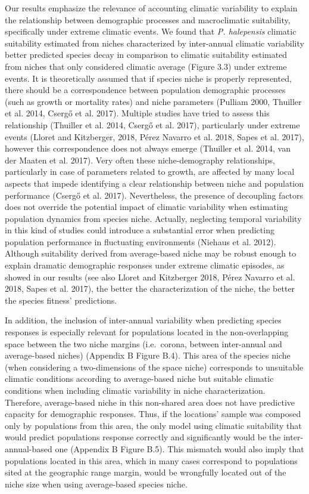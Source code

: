 \documentclass[11pt,twoside]{reedthesis}
\begin{document}
Our results emphasize the relevance of accounting climatic variability
to explain the relationship between demographic processes and
macroclimatic suitability, specifically under extreme climatic events.
We found that \emph{P. halepensis} climatic suitability estimated from
niches characterized by inter-annual climatic variability better
predicted species decay in comparison to climatic suitability estimated
from niches that only considered climatic average (Figure 3.3) under
extreme events. It is theoretically assumed that if species niche is
properly represented, there should be a correspondence between
population demographic processes (such as growth or mortality rates) and
niche parameters (Pulliam 2000, Thuiller et al. 2014, Csergő et al.
2017). Multiple studies have tried to assess this relationship (Thuiller
et al. 2014, Csergő et al. 2017), particularly under extreme events
(Lloret and Kitzberger, 2018, Pérez Navarro et al. 2018, Sapes et al.
2017), however this correspondence does not always emerge (Thuiller et
al. 2014, van der Maaten et al. 2017). Very often these niche-demography
relationships, particularly in case of parameters related to growth, are
affected by many local aspects that impede identifying a clear
relationship between niche and population performance (Csergő et al.
2017). Nevertheless, the presence of decoupling factors does not
override the potential impact of climatic variability when estimating
population dynamics from species niche. Actually, neglecting temporal
variability in this kind of studies could introduce a substantial error
when predicting population performance in fluctuating environments
(Niehaus et al. 2012). Although suitability derived from average-based
niche may be robust enough to explain dramatic demographic responses
under extreme climatic episodes, as showed in our results (see also
Lloret and Kitzberger 2018, Pérez Navarro et al. 2018, Sapes et al.
2017), the better the characterization of the niche, the better the
species fitness' predictions.\par

In addition, the inclusion of inter-annual variability when predicting
species responses is especially relevant for populations located in the
non-overlapping space between the two niche margins (i.e.~corona,
between inter-annual and average-based niches) (Appendix B Figure B.4).
This area of the species niche (when considering a two-dimensions of the
space niche) corresponds to unsuitable climatic conditions according to
average-based niche but suitable climatic conditions when including
climatic variability in niche characterization. Therefore, average-based
niche in this non-shared area does not have predictive capacity for
demographic responses. Thus, if the locations' sample was composed only
by populations from this area, the only model using climatic suitability
that would predict populations response correctly and significantly
would be the inter-annual-based one (Appendix B Figure B.5). This
mismatch would also imply that populations located in this area, which
in many cases correspond to populations sited at the geographic range
margin, would be wrongfully located out of the niche size when using
average-based species niche.\par
\end{document}
